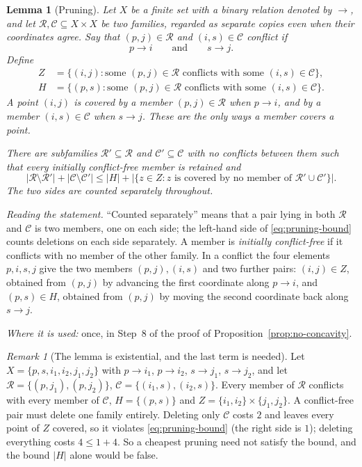 \documentclass[11pt]{article}
\newtheorem{lemma}[theorem]{Lemma}
\theoremstyle{remark}
\newtheorem{remark}[theorem]{Remark}
\newcommand{\abs}[1]{\lvert #1\rvert}
\newcommand{\cR}{\mathcal R}
\newcommand{\cC}{\mathcal C}
\begin{document}
\begin{lemma}[Pruning]\label{lem:pruning}
Let $X$ be a finite set with a binary relation denoted by $\to$, and let
$\mathcal R,\mathcal C\subseteq X\times X$ be two families, regarded as
separate copies even when their coordinates agree. Say that
$(p,j)\in\mathcal R$ and $(i,s)\in\mathcal C$ \emph{conflict} if
\[
 p\to i\qquad\text{and}\qquad s\to j.
\]
Define
\begin{align*}
 Z&=\{(i,j):\text{some }(p,j)\in\mathcal R
       \text{ conflicts with some }(i,s)\in\mathcal C\},\\
 H&=\{(p,s):\text{some }(p,j)\in\mathcal R
       \text{ conflicts with some }(i,s)\in\mathcal C\}.
\end{align*}
A point $(i,j)$ is \emph{covered} by a member $(p,j)\in\mathcal R$ when
$p\to i$, and by a member $(i,s)\in\mathcal C$ when $s\to j$.
These are the only ways a member covers a point.

There are subfamilies $\mathcal R'\subseteq\mathcal R$ and
$\mathcal C'\subseteq\mathcal C$ with no conflicts between them such that
every initially conflict-free member is retained and
\begin{equation}\label{eq:pruning-bound}
 \abs{\mathcal R\setminus\mathcal R'}+
 \abs{\mathcal C\setminus\mathcal C'}
 \leq \abs H+
 \abs{\{z\in Z:z\text{ is covered by no member of }
                    \mathcal R'\cup\mathcal C'\}}.
\end{equation}
The two sides are counted separately throughout.
\end{lemma}

\emph{Reading the statement.} ``Counted separately'' means that a pair lying
in both $\cR$ and $\cC$ is two members, one on each side; the left-hand side
of \eqref{eq:pruning-bound} counts deletions on each side separately.
A member is \emph{initially conflict-free} if it conflicts with no member of
the other family. In a conflict the four elements $p,i,s,j$ give the two
members $(p,j),(i,s)$ and two further pairs: $(i,j)\in Z$, obtained from
$(p,j)$ by advancing the first coordinate along $p\to i$, and
$(p,s)\in H$, obtained from $(p,j)$ by moving the second coordinate back
along $s\to j$.

\emph{Where it is used:} once, in Step~8 of the proof of
Proposition~\ref{prop:no-concavity}.

\begin{remark}[The lemma is existential, and the last term is needed]
Let $X=\{p,s,i_1,i_2,j_1,j_2\}$ with $p\to i_1$, $p\to i_2$, $s\to j_1$,
$s\to j_2$, and let $\cR=\{(p,j_1),(p,j_2)\}$,
$\cC=\{(i_1,s),(i_2,s)\}$. Every member of $\cR$ conflicts with every member
of $\cC$, $H=\{(p,s)\}$ and $Z=\{i_1,i_2\}\times\{j_1,j_2\}$. A conflict-free
pair must delete one family entirely. Deleting only $\cC$ costs $2$ and
leaves every point of $Z$ covered, so it violates \eqref{eq:pruning-bound}
(the right side is $1$); deleting everything costs $4\le 1+4$. So a
cheapest pruning need not satisfy the bound, and the bound $\abs H$ alone
would be false.
\end{remark}
\end{document}
